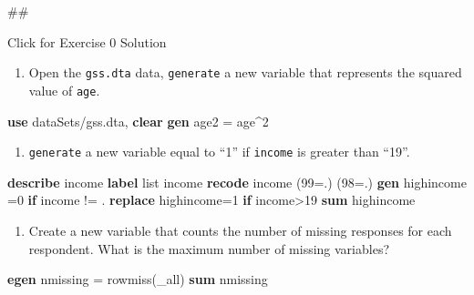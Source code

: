 \documentclass[
]{book}
\newenvironment{Shaded}{\begin{snugshade}}{\end{snugshade}}
\newcommand{\DataTypeTok}[1]{\textcolor[rgb]{0.13,0.29,0.53}{#1}}
\newcommand{\FunctionTok}[1]{\textcolor[rgb]{0.00,0.00,0.00}{#1}}
\newcommand{\KeywordTok}[1]{\textcolor[rgb]{0.13,0.29,0.53}{\textbf{#1}}}
\newcommand{\NormalTok}[1]{#1}
\newcommand{\OtherTok}[1]{\textcolor[rgb]{0.56,0.35,0.01}{#1}}
\providecommand{\tightlist}{%
  \setlength{\itemsep}{0pt}\setlength{\parskip}{0pt}}
\begin{document}
\begin{Shaded}
\begin{Highlighting}[]
\NormalTok{\#\#}
\end{Highlighting}
\end{Shaded}

{Click for Exercise 0 Solution}

\begin{enumerate}
\def\labelenumi{\arabic{enumi}.}
\tightlist
\item
  Open the \texttt{gss.dta} data, \texttt{generate} a new variable that represents the squared value of \texttt{age}.
\end{enumerate}

\begin{Shaded}
\begin{Highlighting}[]
\KeywordTok{use}\NormalTok{ dataSets/gss.dta, }\KeywordTok{clear}
\KeywordTok{gen}\NormalTok{ age2 = age\^{}2}
\end{Highlighting}
\end{Shaded}

\begin{enumerate}
\def\labelenumi{\arabic{enumi}.}
\setcounter{enumi}{1}
\tightlist
\item
  \texttt{generate} a new variable equal to ``1'' if \texttt{income} is greater than ``19''.
\end{enumerate}

\begin{Shaded}
\begin{Highlighting}[]
\KeywordTok{describe}\NormalTok{ income}
\KeywordTok{label} \OtherTok{list}\NormalTok{ income}
\KeywordTok{recode}\NormalTok{ income (99=.) (98=.)}
\KeywordTok{gen}\NormalTok{ highincome =0 }\KeywordTok{if}\NormalTok{ income != .}
\KeywordTok{replace}\NormalTok{ highincome=1 }\KeywordTok{if}\NormalTok{ income\textgreater{}19}
\KeywordTok{sum}\NormalTok{ highincome}
\end{Highlighting}
\end{Shaded}

\begin{enumerate}
\def\labelenumi{\arabic{enumi}.}
\setcounter{enumi}{2}
\tightlist
\item
  Create a new variable that counts the number of missing responses for each respondent. What is the maximum number of missing variables?
\end{enumerate}

\begin{Shaded}
\begin{Highlighting}[]
\KeywordTok{egen}\NormalTok{ nmissing = }\FunctionTok{rowmiss}\NormalTok{(}\DataTypeTok{\_all}\NormalTok{)}
\KeywordTok{sum}\NormalTok{ nmissing}
\end{Highlighting}
\end{Shaded}
\end{document}
